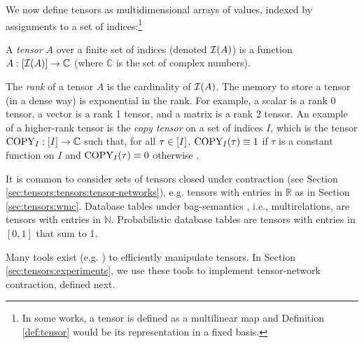 
We now define tensors as multidimensional arrays of values, indexed by assignments to a set of indices:\footnote{In some works, a tensor is defined as a multilinear map and Definition \ref{def:tensor} would be its representation in a fixed basis.}
\begin{definition}[Tensor] \label{def:tensor}
	A \emph{tensor} $A$ over a finite set of indices (denoted $\mathcal{I}(A)$) is a function $A: [\mathcal{I}(A)] \rightarrow \mathbb{C}$ (where $\mathbb{C}$ is the set of complex numbers).
\end{definition}

The \emph{rank} of a tensor $A$ is the cardinality of $\mathcal{I}(A)$. The memory to store a tensor (in a dense way) is exponential in the rank. For example, a scalar is a rank 0 tensor, a vector is a rank 1 tensor, and a matrix is a rank 2 tensor. An example of a higher-rank tensor is the \emph{copy tensor} on a set of indices $I$, which is the tensor $\text{COPY}_I: [I] \rightarrow \mathbb{C}$ such that, for all $\tau \in [I]$, $\text{COPY}_I(\tau) \equiv 1$ if $\tau$ is a constant function on $I$ and $\text{COPY}_I(\tau) \equiv 0$ otherwise \cite{BCJ11}.

It is common to consider sets of tensors closed under contraction (see Section \ref{sec:tensors:tensors:tensor-networks}), e.g. tensors with entries in $\mathbb{R}$ as in Section \ref{sec:tensors:wmc}. Database tables under bag-semantics \cite{CV93}, i.e., multirelations, are tensors with entries in $\mathbb{N}$. Probabilistic database tables \cite{CP87} are tensors with entries in $[0, 1]$ that sum to 1.

Many tools exist (e.g.  \cite{numpy}) to efficiently manipulate tensors. In Section \ref{sec:tensors:experiments}, we use these tools to implement tensor-network contraction, defined next.



